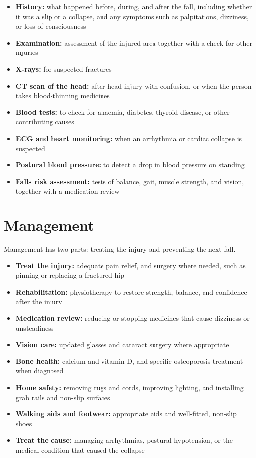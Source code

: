\begin{itemize}
    \item \textbf{History:} what happened before, during, and after the fall, including whether it was a slip or a collapse, and any symptoms such as palpitations, dizziness, or loss of consciousness
    \item \textbf{Examination:} assessment of the injured area together with a check for other injuries
    \item \textbf{X-rays:} for suspected fractures
    \item \textbf{CT scan of the head:} after head injury with confusion, or when the person takes blood-thinning medicines
    \item \textbf{Blood tests:} to check for anaemia, diabetes, thyroid disease, or other contributing causes
    \item \textbf{ECG and heart monitoring:} when an arrhythmia or cardiac collapse is suspected
    \item \textbf{Postural blood pressure:} to detect a drop in blood pressure on standing
    \item \textbf{Falls risk assessment:} tests of balance, gait, muscle strength, and vision, together with a medication review
\end{itemize}

\section*{Management}
Management has two parts: treating the injury and preventing the next fall.

\begin{itemize}
    \item \textbf{Treat the injury:} adequate pain relief, and surgery where needed, such as pinning or replacing a fractured hip
    \item \textbf{Rehabilitation:} physiotherapy to restore strength, balance, and confidence after the injury
    \item \textbf{Medication review:} reducing or stopping medicines that cause dizziness or unsteadiness
    \item \textbf{Vision care:} updated glasses and cataract surgery where appropriate
    \item \textbf{Bone health:} calcium and vitamin D, and specific osteoporosis treatment when diagnosed
    \item \textbf{Home safety:} removing rugs and cords, improving lighting, and installing grab rails and non-slip surfaces
    \item \textbf{Walking aids and footwear:} appropriate aids and well-fitted, non-slip shoes
    \item \textbf{Treat the cause:} managing arrhythmias, postural hypotension, or the medical condition that caused the collapse
\end{itemize}

